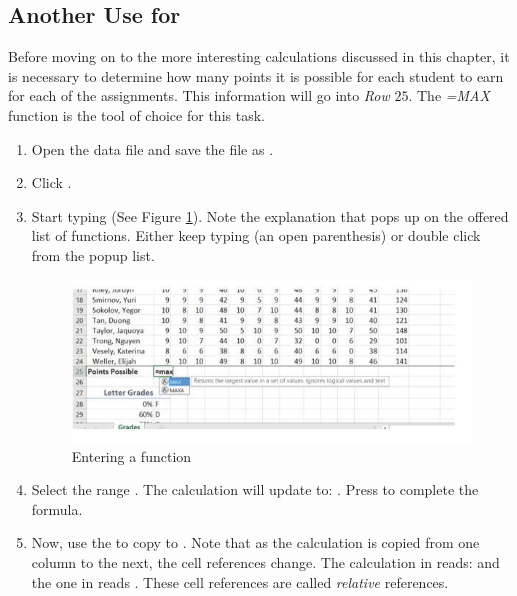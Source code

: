 \subsection{Another Use for }

Before moving on to the more interesting calculations discussed in this chapter, it is necessary to determine how many points it is possible for each student to earn for each of the assignments. This information will go into \textit{Row} $ 25 $. The \textit{=MAX} function is the tool of choice for this task.

\begin{enumbox}
	\begin{enumerate}
		\item Open the data file  and save the file as .
		\item Click .
		\item Start typing  (See Figure \ref{03:fig02}). Note the explanation that pops up on the offered list of functions. Either keep typing \fmtTyping{(} (an open parenthesis) or double click  from the popup list.

		\begin{figure}[H]
			\centering
			\includegraphics[width=\maxwidth{.95\linewidth}]{gfx/ch03_fig02}
			\caption{Entering a function}
			\label{03:fig02}
		\end{figure}
	
		\item Select the range . The calculation will update to: . Press  to complete the formula.
		\item Now, use the  to copy  to . Note that as the calculation is copied from one column to the next, the cell references change. The calculation in  reads:  and the one in  reads . These cell references are called \textit{relative} references.
	\end{enumerate}
\end{enumbox}

